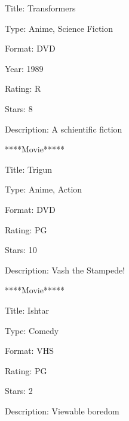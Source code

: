 \documentclass{wileySix}
\begin{document}
\begin{myEnumerate}
	\noindent 
	{\fontsize{10pt}{10pt}\selectfont Title: Transformers} \par
	\noindent 
	{\fontsize{10pt}{10pt}\selectfont Type: Anime, Science Fiction} \par
	\noindent 
	{\fontsize{10pt}{10pt}\selectfont Format: DVD} \par
	\noindent 
	{\fontsize{10pt}{10pt}\selectfont Year: 1989} \par
	\noindent 
	{\fontsize{10pt}{10pt}\selectfont Rating: R} \par
	\noindent 
	{\fontsize{10pt}{10pt}\selectfont Stars: 8} \par
	\noindent 
	{\fontsize{10pt}{10pt}\selectfont Description: A schientific fiction} \par
	\noindent 
	{\fontsize{10pt}{10pt}\selectfont *****Movie*****} \par
	\noindent 
	{\fontsize{10pt}{10pt}\selectfont Title: Trigun} \par
	\noindent 
	{\fontsize{10pt}{10pt}\selectfont Type: Anime, Action} \par
	\noindent 
	{\fontsize{10pt}{10pt}\selectfont Format: DVD} \par
	\noindent 
	{\fontsize{10pt}{10pt}\selectfont Rating: PG} \par
	\noindent 
	{\fontsize{10pt}{10pt}\selectfont Stars: 10} \par
	\noindent 
	{\fontsize{10pt}{10pt}\selectfont Description: Vash the Stampede!} \par
	\noindent 
	{\fontsize{10pt}{10pt}\selectfont *****Movie*****} \par
	\noindent 
	{\fontsize{10pt}{10pt}\selectfont Title: Ishtar} \par
	\noindent 
	{\fontsize{10pt}{10pt}\selectfont Type: Comedy} \par
	\noindent 
	{\fontsize{10pt}{10pt}\selectfont Format: VHS} \par
	\noindent 
	{\fontsize{10pt}{10pt}\selectfont Rating: PG} \par
	\noindent 
	{\fontsize{10pt}{10pt}\selectfont Stars: 2} \par
	\noindent 
	{\fontsize{10pt}{10pt}\selectfont Description: Viewable boredom} \par
	\noindent 
	{\fontsize{10pt}{10pt}\selectfont 
			
}
\end{myEnumerate}
\end{document}
